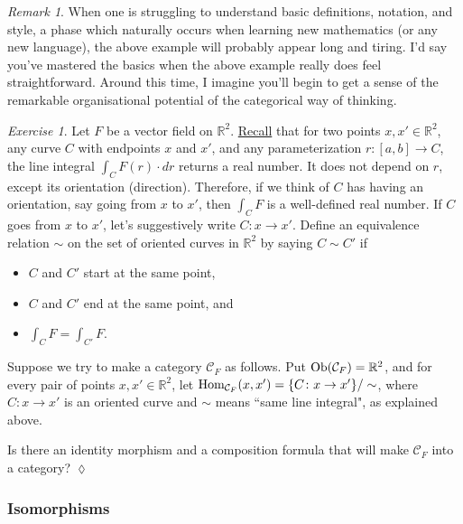 \documentclass{book}
\def\tn{\textnormal}
\def\mc{\mathcal}
\def\RR{{\mathbb R}}
\def\Hom{\tn{Hom}}
\def\Ob{\tn{Ob}}
\def\to{\rightarrow}
\def\taking{\colon}
\def\mcC{\mc{C}}
\theoremstyle{remark}
\newtheorem{remark}[subsubsection]{Remark}
\newtheorem{exc}[subsubsection]{Exercise}
\newenvironment{exercise}{\begin{exc}}{\hspace*{\fill}$\lozenge$\end{exc}}
\theoremstyle{definition}
\begin{document}
\begin{remark}

When one is struggling to understand basic definitions, notation, and style, a phase which naturally occurs when learning new mathematics (or any new language), the above example will probably appear long and tiring. I'd say you've mastered the basics when the above example really does feel straightforward. Around this time, I imagine you'll begin to get a sense of the remarkable organisational potential of the categorical way of thinking.

\end{remark} 

\begin{exercise}\label{exc:vector field 1}
Let $F$ be a vector field on $\RR^2$. \href{http://en.wikipedia.org/wiki/Line_integral#Line_integral_of_a_vector_field}{Recall} that for two points $x,x'\in\RR^2$, any curve $C$ with endpoints $x$ and $x'$, and any parameterization $r\taking [a,b]\to C$, the line integral $\int_CF(r)\cdot dr$ returns a real number. It does not depend on $r$, except its orientation (direction). Therefore, if we think of $C$ has having an orientation, say going from $x$ to $x'$, then $\int_CF$ is a well-defined real number. If $C$ goes from $x$ to $x'$, let's suggestively write $C\taking x\to x'$. Define an equivalence relation $\sim$ on the set of oriented curves in $\RR^2$ by saying $C\sim C'$ if
\begin{itemize}
\item $C$ and $C'$ start at the same point,
\item $C$ and $C'$ end at the same point, and
\item $\int_CF=\int_{C'}F$.
\end{itemize}

Suppose we try to make a category $\mcC_F$ as follows. Put $\Ob(\mcC_F)=\RR^2$, and for every pair of points $x,x'\in\RR^2$, let $\Hom_{\mcC_F}(x,x')=\{C\taking x\to x'\}/\sim$, where $C\taking x\to x'$ is an oriented curve and $\sim$ means ``same line integral", as explained above. 

Is there an identity morphism and a composition formula that will make $\mcC_F$ into a category? 
\end{exercise}


\subsubsection{Isomorphisms}
\end{document}
